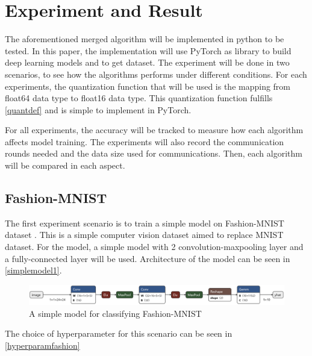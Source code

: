\section{Experiment and Result}
The aforementioned merged algorithm will be implemented in python to be tested. In this paper, the implementation will use PyTorch \cite{NEURIPS2019_9015} as library to build deep learning models and to get dataset. The experiment will be done in two scenarios, to see how the algorithms performs under different conditions. For each experiments, the quantization function that will be used is the mapping from float64 data type to float16 data type. This quantization function fulfills \autoref{quantdef} and is simple to implement in PyTorch.

For all experiments, the accuracy will be tracked to measure how each algorithm affects model training. The experiments will also record the communication rounds needed and the data size used for communications. Then, each algorithm will be compared in each aspect.

\subsection{Fashion-MNIST}
The first experiment scenario is to train a simple model on Fashion-MNIST dataset \cite{xiao2017fashion}. This is a simple computer vision dataset aimed to replace MNIST dataset. For the model, a simple model with 2 convolution-maxpooling layer and a fully-connected layer will be used. Architecture of the model can be seen in \autoref{simplemodel1}.
\begin{figure}[htbp]
  \centering
  \includegraphics[width=0.8\columnwidth]{resources/fashion_mnist.onnx.png}
  \caption{\label{simplemodel1}A simple model for classifying Fashion-MNIST}
\end{figure}

The choice of hyperparameter for this scenario can be seen in \autoref{hyperparamfashion}

